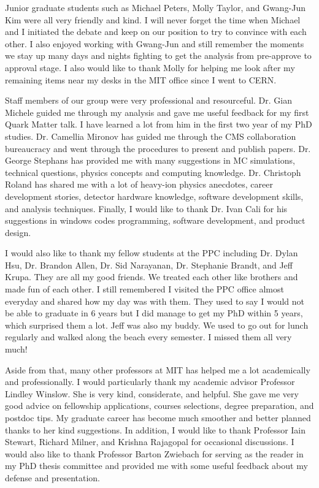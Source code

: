 Junior graduate students such as Michael Peters, Molly Taylor, and Gwang-Jun Kim were all very friendly and kind. I will never forget the time when Michael and I initiated the debate and keep on our position to try to convince with each other. I also enjoyed working with Gwang-Jun and still remember the moments we stay up many days and nights fighting to get the analysis from pre-approve to approval stage. I also would like to thank Molly for helping me look after my remaining items near my desks in the MIT office since I went to CERN. 


Staff members of our group were very professional and resourceful. Dr. Gian Michele guided me through my analysis and gave me useful feedback for my first Quark Matter talk. I have learned a lot from him in the first two year of my PhD studies. Dr. Camellia Mironov has guided me through the CMS collaboration bureaucracy and went through the procedures to present and publish papers. Dr. George Stephans has provided me with many suggestions in MC simulations, technical questions, physics concepts and computing knowledge. Dr. Christoph Roland has shared me with a lot of heavy-ion physics anecdotes, career development stories, detector hardware knowledge, software development skills, and analysis techniques. Finally, I would like to thank Dr. Ivan Cali for his suggestions in windows codes programming, software development, and product design. 


I would also like to thank my fellow students at the PPC including Dr. Dylan Hsu, Dr. Brandon Allen, Dr. Sid Narayanan, Dr. Stephanie Brandt, and Jeff Krupa. They are all my good friends. We treated each other like brothers and made fun of each other. I still remembered I visited the PPC office almost everyday and shared how my day was with them. They used to say I would not be able to graduate in 6 years but I did manage to get my PhD within 5 years, which surprised them a lot. Jeff was also my buddy. We used to go out for lunch regularly and walked along the beach every semester. I missed them all very much!

Aside from that, many other professors at MIT has helped me a lot academically and professionally. I would particularly thank my academic advisor Professor Lindley Winslow. She is very kind, considerate, and helpful. She gave me very good advice on fellowship applications, courses selections, degree preparation, and postdoc tips. My graduate career has become much smoother and better planned thanks to her kind suggestions. In addition, I would like to thank Professor Iain Stewart, Richard Milner, and Krishna Rajagopal for occasional discussions. I would also like to thank Professor Barton Zwiebach for serving as the reader in my PhD thesis committee and provided me with some useful feedback about my defense and presentation.


